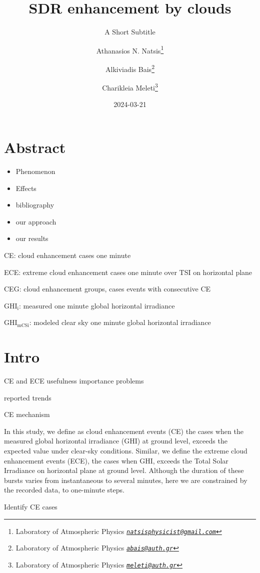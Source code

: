 \documentclass[
]{article}
\title{SDR enhancement by clouds}
\subtitle{A Short Subtitle}
\author{Athanasios N. Natsis\footnote{Laboratory of Atmospheric Physics \emph{\href{mailto:natsisphysicist@gmail.com}{\nolinkurl{natsisphysicist@gmail.com}}}} \and Alkiviadis Bais\footnote{Laboratory of Atmospheric Physics \emph{\href{mailto:abais@auth.gr}{\nolinkurl{abais@auth.gr}}}} \and Charikleia Meleti\footnote{Laboratory of Atmospheric Physics \emph{\href{mailto:meleti@auth.gr}{\nolinkurl{meleti@auth.gr}}}}}
\date{2024-03-21}
\providecommand{\tightlist}{%
  \setlength{\itemsep}{0pt}\setlength{\parskip}{0pt}}
\begin{document}
\maketitle

{
\setcounter{tocdepth}{4}
\tableofcontents
}
\hypertarget{abstract}{%
\section*{Abstract}\label{abstract}}

\begin{itemize}
\tightlist
\item
  Phenomenon
\item
  Effects
\item
  bibliography
\item
  our approach
\item
  our results
\end{itemize}

CE: cloud enhancement cases one minute

ECE: extreme cloud enhancement cases one minute over TSI on horizontal plane

CEG: cloud enhancement groups, cases events with consecutive CE

\(\text{GHI}_\text{i}\): measured one minute global horizontal irradiance

\(\text{GHI}_\text{mCSi}\): modeled clear sky one minute global horizontal irradiance

\hypertarget{intro}{%
\section{Intro}\label{intro}}

CE and ECE usefulness
importance
problems

reported trends

CE mechanism

In this study, we define as cloud enhancement events (CE) the cases when the measured
global horizontal irradiance (GHI) at ground level, exceeds the expected value under
clear-sky conditions.
Similar, we define the extreme cloud enhancement events (ECE), the cases when GHI,
exceeds the Total Solar Irradiance on horizontal plane at ground level.
Although the duration of these bursts varies from instantaneous to several minutes,
here we are constrained by the recorded data, to one-minute steps.

Identify CE cases
\end{document}
